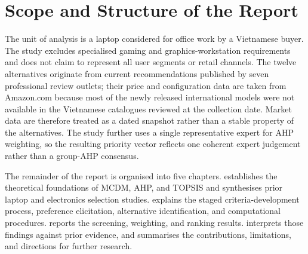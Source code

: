 \section{Scope and Structure of the Report}\label{sec:scope}

The unit of analysis is a laptop considered for office work by a Vietnamese buyer. The study
excludes specialised gaming and graphics-workstation requirements and does not claim to represent
all user segments or retail channels. The twelve alternatives originate from current
recommendations published by seven professional review outlets; their price and configuration
data are taken from Amazon.com because most of the newly released international models were not
available in the Vietnamese catalogues reviewed at the collection date. Market data are therefore
treated as a dated snapshot rather than a stable property of the alternatives. The study further
uses a single representative expert for AHP weighting, so the resulting priority vector reflects
one coherent expert judgement rather than a group-AHP consensus.

The remainder of the report is organised into five chapters.  establishes the
theoretical foundations of MCDM, AHP, and TOPSIS and synthesises prior laptop and electronics
selection studies.  explains the staged criteria-development process,
preference elicitation, alternative identification, and computational procedures.
 reports the screening, weighting, and ranking results. 
interprets those findings against prior evidence, and  summarises the
contributions, limitations, and directions for further research.
